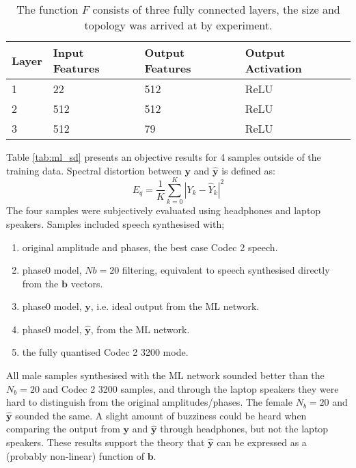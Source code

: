 \documentclass{article}
\begin{document}
\begin{table}[H]
\label{tab:ml_network}
\centering
\begin{tabular}{l l l l}
\hline
Layer & Input Features & Output Features & Output Activation \\
\hline
1 & 22 & 512 & ReLU  \\
2 & 512 & 512 & ReLU  \\
3 & 512 & 79 & ReLU  \\
\hline
\end{tabular}
\caption{The function $F$ consists of three fully connected layers, the size and topology was arrived at by experiment.}
\end{table}

Table \ref{tab:ml_sd} presents an objective results for 4 samples outside of the training data.  Spectral distortion between $\mathbf{y}$ and $\hat{\mathbf{y}}$ is defined as:
\begin{equation}
E_q = \frac{1}{K}\sum_{k=0}^K |Y_k - \hat{Y}_k |^2
\end{equation}
The four samples were subjectively evaluated using headphones and laptop speakers.  Samples included speech synthesised with;
\begin{enumerate}
\item original amplitude and phases, the best case Codec 2 speech.
\item phase0 model, $Nb=20$ filtering, equivalent to speech synthesised directly from the $\mathbf{b}$ vectors.
\item phase0 model, $\mathbf{y}$, i.e. ideal output from the ML network.
\item phase0 model, $\hat{\mathbf{y}}$, from the ML network.
\item the fully quantised Codec 2 3200 mode.
\end{enumerate}
All male samples synthesised with the ML network sounded better than the $N_b=20$ and Codec 2 3200 samples, and through the laptop speakers they were hard to distinguish from the original amplitudes/phases.  The female $N_b=20$ and  $\hat{\mathbf{y}}$ sounded the same.  A slight amount of buzziness could be heard when comparing the output from $\mathbf{y}$ and $\hat{\mathbf{y}}$ through headphones, but not the laptop speakers. These results support the theory that $\hat{\mathbf{y}}$ can be expressed as a (probably non-linear) function of $\mathbf{b}$. 
\end{document}
